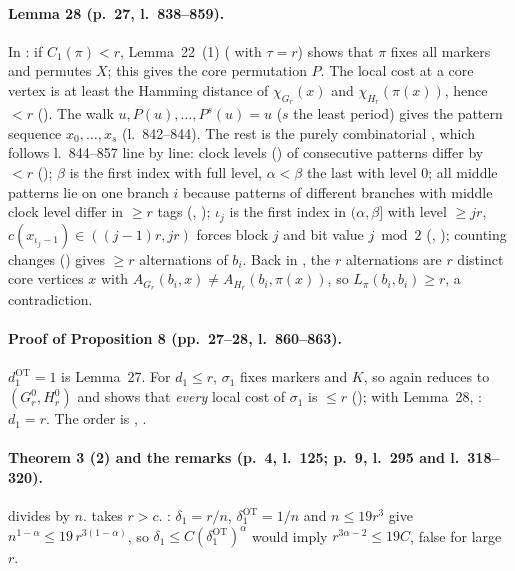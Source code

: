 \paragraph{Lemma 28 (p.~27, l.~838--859).} In : if $C_1(\pi)<r$, Lemma~22~(1)
( with $\tau=r$) shows that $\pi$ fixes all markers and permutes $X$; this gives the core
permutation $P$. The local cost at a core vertex is at least the Hamming distance of
$\chi_{G_r}(x)$ and $\chi_{H_r}(\pi(x))$, hence $<r$ (). The walk
$u,P(u),\dots,P^s(u)=u$ ($s$ the least period) gives the pattern sequence $x_0,\dots,x_s$ (l.~842--844). The
rest is the purely combinatorial , which follows l.~844--857 line by line: clock levels
() of consecutive patterns differ by $<r$ (); $\beta$ is the first
index with full level, $\alpha<\beta$ the last with level $0$; all middle patterns lie on one branch $i$
because patterns of different branches with middle clock level differ in $\ge r$ tags
(, ); $\iota_j$ is the first index in $(\alpha,\beta]$ with
level $\ge jr$, $c(x_{\iota_j-1})\in((j-1)r,jr)$ forces block $j$ and bit value $j\bmod2$
(, ); counting changes () gives $\ge r$
alternations of $b_i$. Back in , the $r$ alternations are $r$ distinct core vertices $x$ with
$A_{G_r}(b_i,x)\ne A_{H_r}(b_i,\pi(x))$, so $L_\pi(b_i,b_i)\ge r$, a contradiction.

\paragraph{Proof of Proposition 8 (pp.~27--28, l.~860--863).} $d_1^{\mathrm{OT}}=1$ is Lemma~27. For $d_1\le r$,
$\sigma_1$ fixes markers and $K$, so  again reduces to $(G^0_r,H^0_r)$ and
 shows that \emph{every} local cost of $\sigma_1$ is $\le r$
(); with Lemma~28, : $d_1=r$. The order is ,
.

\paragraph{Theorem 3 (2) and the remarks (p.~4, l.~125; p.~9, l.~295 and l.~318--320).}  divides by $n$.
 takes $r>c$. : $\delta_1=r/n$, $\delta_1^{\mathrm{OT}}=1/n$ and
$n\le19r^3$ give $n^{1-\alpha}\le19\,r^{3(1-\alpha)}$, so $\delta_1\le C(\delta_1^{\mathrm{OT}})^\alpha$ would imply
$r^{3\alpha-2}\le19C$, false for large $r$.

